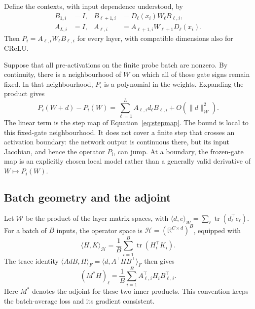 \documentclass{article}
\theoremstyle{definition}
\theoremstyle{remark}
\begin{document}
Define the contexts, with input dependence understood, by
\begin{equation}
 \begin{aligned}
 B_{1,i}&=I,& B_{\ell+1,i}&=D_\ell(x_i)W_\ell B_{\ell,i},\\
 A_{L,i}&=I,& A_{\ell,i}&=A_{\ell+1,i}W_{\ell+1}D_\ell(x_i).
 \end{aligned}
\end{equation}
Then $P_i=A_{\ell,i}W_\ell B_{\ell,i}$ for every layer, with compatible dimensions also for CReLU.

Suppose that all pre-activations on the finite probe batch are nonzero. By continuity, there is a neighbourhood of $W$ on which all of those gate signs remain fixed. In that neighbourhood, $P_i$ is a polynomial in the weights. Expanding the product gives
\begin{equation}
 P_i(W+d)-P_i(W)
 =\sum_{\ell=1}^L A_{\ell,i}d_\ell B_{\ell,i}
   +O(\|d\|_{\mathcal W}^2).
 \label{eq:app-local}
\end{equation}
The linear term is the step map of Equation~\eqref{eq:stepmap}. The bound is local to this fixed-gate neighbourhood. It does not cover a finite step that crosses an activation boundary: the network output is continuous there, but its input Jacobian, and hence the operator $P_i$, can jump. At a boundary, the frozen-gate map is an explicitly chosen local model rather than a generally valid derivative of $W\mapsto P_i(W)$.

\subsection{Batch geometry and the adjoint}

Let $\mathcal W$ be the product of the layer matrix spaces, with
$\langle d,e\rangle_{\mathcal W}=\sum_\ell\operatorname{tr}(d_\ell^\top e_\ell)$.
For a batch of $B$ inputs, the operator space is
$\mathcal H=(\mathbb R^{C\times d})^B$, equipped with
\begin{equation}
 \langle H,K\rangle_{\mathcal H}
 =\frac1B\sum_{i=1}^B\operatorname{tr}(H_i^\top K_i).
 \label{eq:app-inner}
\end{equation}
The trace identity
$\langle A d B,H\rangle_F=\langle d,A^\top H B^\top\rangle_F$
then gives
\begin{equation}
 (M^*H)_\ell
 =\frac1B\sum_{i=1}^B A_{\ell,i}^\top H_i B_{\ell,i}^\top.
 \label{eq:app-adjoint}
\end{equation}
Here $M^*$ denotes the adjoint for these two inner products. This convention keeps the batch-average loss and its gradient consistent.
\end{document}
